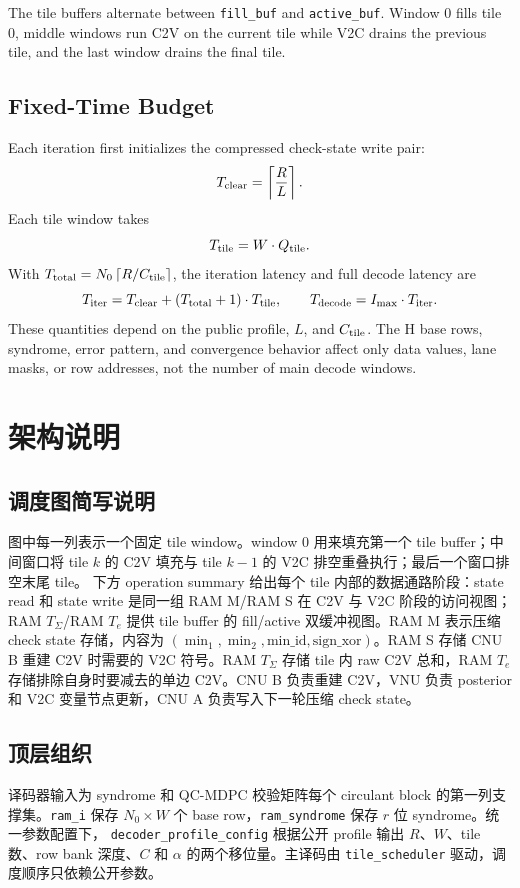 \documentclass{article}
\begin{document}
The tile buffers alternate between \texttt{fill\_buf} and \texttt{active\_buf}.
Window 0 fills tile 0, middle windows run C2V on the current tile while V2C
drains the previous tile, and the last window drains the final tile.

\subsection{Fixed-Time Budget}

Each iteration first initializes the compressed check-state write pair:
\[
  T_{\rm clear}=\left\lceil\frac{R}{L}\right\rceil .
\]
Each tile window takes
\[
  T_{\rm tile}=W\cdot Q_{\rm tile}.
\]
With $T_{\rm total}=N_0\left\lceil R/C_{\rm tile}\right\rceil$, the iteration
latency and full decode latency are
\[
  T_{\rm iter}=T_{\rm clear}+(T_{\rm total}+1)\cdot T_{\rm tile},
  \qquad
  T_{\rm decode}=I_{\max}\cdot T_{\rm iter}.
\]
These quantities depend on the public profile, $L$, and $C_{\rm tile}$. The H
base rows, syndrome, error pattern, and convergence behavior affect only data
values, lane masks, or row addresses, not the number of main decode windows.
\else
\section{架构说明}

\subsection{调度图简写说明}

图中每一列表示一个固定 tile window。window 0 用来填充第一个 tile buffer；中间窗口将
tile $k$ 的 C2V 填充与 tile $k-1$ 的 V2C 排空重叠执行；最后一个窗口排空末尾 tile。
下方 operation summary 给出每个 tile 内部的数据通路阶段：state read 和 state write 是同一组
RAM M/RAM S 在 C2V 与 V2C 阶段的访问视图；RAM $T_\Sigma$/RAM $T_e$ 提供 tile buffer 的
fill/active 双缓冲视图。RAM M 表示压缩 check state 存储，内容为
$(\min_1,\min_2,\text{min\_id},\text{sign\_xor})$。RAM S 存储 CNU B 重建
C2V 时需要的 V2C 符号。RAM $T_\Sigma$ 存储 tile 内 raw C2V 总和，RAM $T_e$
存储排除自身时要减去的单边 C2V。CNU B 负责重建 C2V，VNU 负责 posterior 和 V2C
变量节点更新，CNU A 负责写入下一轮压缩 check state。

\subsection{顶层组织}

译码器输入为 syndrome 和 QC-MDPC 校验矩阵每个 circulant block 的第一列支撑集。\texttt{ram\_i}
保存 $N_0\times W$ 个 base row，\texttt{ram\_syndrome} 保存 $r$ 位 syndrome。统一参数配置下，
\texttt{decoder\_profile\_config} 根据公开 profile 输出 $R$、$W$、tile 数、row bank 深度、$C$ 和
$\alpha$ 的两个移位量。主译码由 \texttt{tile\_scheduler} 驱动，调度顺序只依赖公开参数。
\end{document}
